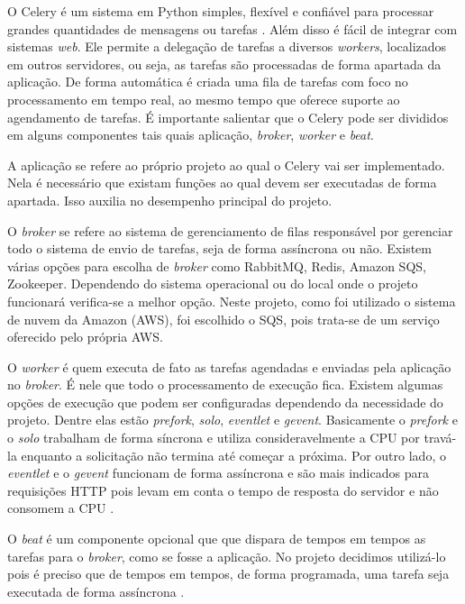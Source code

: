 \indent 
\par O Celery é um sistema em Python simples, flexível e confiável para processar grandes quantidades de mensagens ou tarefas \cite{Celery}. Além disso é fácil de integrar com sistemas \textit{web}. Ele permite a delegação de tarefas a diversos \textit{workers}, localizados em outros servidores, ou seja, as tarefas são processadas de forma apartada da aplicação. De forma automática é criada uma fila de tarefas com foco no processamento em tempo real, ao mesmo tempo que oferece suporte ao agendamento de tarefas. É importante salientar que o Celery pode ser divididos em alguns componentes tais quais aplicação, \textit{broker}, \textit{worker} e \textit{beat}.
\indent 
\par A aplicação se refere ao próprio projeto ao qual o Celery vai ser implementado. Nela é necessário que existam funções ao qual devem ser executadas de forma apartada. Isso auxilia no desempenho principal do projeto.
\indent 
\par O \textit{broker} se refere ao sistema de gerenciamento de filas responsável por gerenciar todo o sistema de envio de tarefas, seja de forma assíncrona ou não. Existem várias opções para escolha de \textit{broker} como RabbitMQ, Redis, Amazon SQS, Zookeeper. Dependendo do sistema operacional ou do local onde o projeto funcionará verifica-se a melhor opção. Neste projeto, como foi utilizado o sistema de nuvem da Amazon (AWS), foi escolhido o SQS, pois trata-se de um serviço oferecido pelo própria AWS.
\indent 
\par O \textit{worker} é quem executa de fato as tarefas agendadas e enviadas pela aplicação no \textit{broker}. É nele que todo o processamento de execução fica. Existem algumas opções de execução que podem ser configuradas dependendo da necessidade do projeto. Dentre elas estão \textit{prefork}, \textit{solo}, \textit{eventlet} e \textit{gevent}. Basicamente o \textit{prefork} e o \textit{solo} trabalham de forma síncrona e utiliza consideravelmente a CPU por travá-la enquanto a solicitação não termina até começar a próxima. Por outro lado, o \textit{eventlet} e o \textit{gevent} funcionam de forma assíncrona e são mais indicados para requisições HTTP pois levam em conta o tempo de resposta do servidor e não consomem a CPU \cite{CeleryEP}. 
\indent 
\par O \textit{beat} é um componente opcional que que dispara de tempos em tempos as tarefas para o \textit{broker}, como se fosse a aplicação. No projeto decidimos utilizá-lo pois é preciso que de tempos em tempos, de forma programada, uma tarefa seja executada de forma assíncrona \cite{CeleryTAP}.

